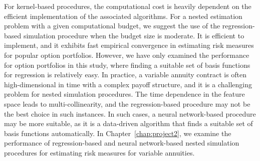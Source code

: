 For kernel-based procedures, the computational cost is heavily dependent on the efficient implementation of the associated algorithms.
For a nested estimation problem with a given computational budget, we suggest the use of the regression-based simulation procedure when the budget size is moderate. 
It is efficient to implement, and it exhibits fast empirical convergence in estimating risk measures for popular option portfolios. 
However, we have only examined the performance for option portfolios in this study, where finding a suitable set of basis functions for regression is relatively easy.
In practice, a variable annuity contract is often high-dimensional in time with a complex payoff structure, and it is a challenging problem for nested simulation procedures.
The time dependence in the feature space leads to multi-collinearity, and the regression-based procedure may not be the best choice in such instances.
In such cases, a neural network-based procedure may be more suitable, as it is a data-driven algorithm that finds a suitable set of basis functions automatically.
In Chapter~\ref{chap:project2}, we examine the performance of regression-based and neural network-based nested simulation procedures for estimating risk measures for variable annuities.
